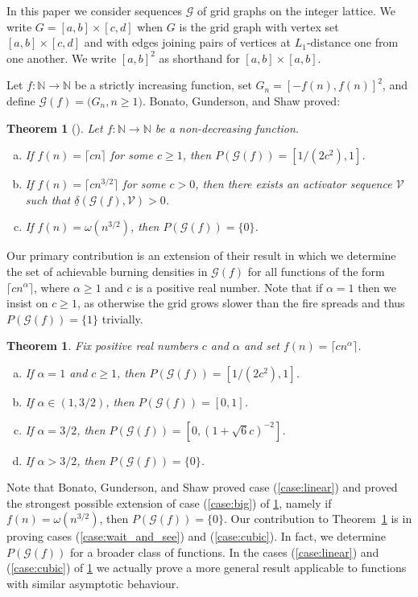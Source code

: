 \documentclass[12pt]{article}
\newtheorem{theorem}{Theorem}[section]
\newtheorem*{theorem*}{Theorem}
\theoremstyle{remark}
\providecommand{\N}{}
\renewcommand{\N}{{\mathbb N}}
\newcommand\cG{\mathcal G}
\newcommand\cV{\mathcal V}
\begin{document}
\medskip

In this paper we consider sequences $\cG$ of grid graphs on the integer lattice. We write $G = [a,b] \times [c,d]$ when $G$ is the grid graph with vertex set $[a,b] \times [c,d]$ and with edges joining pairs of vertices at $L_1$-distance one from one another. We write $[a,b]^2$ as shorthand for $[a,b] \times [a,b]$. 

Let $f: \N \to \N$ be a strictly increasing function, set $G_n = [-f(n),f(n)]^2$, and define $\cG(f) = \big( G_n, n\geq 1 \big)$. Bonato, Gunderson, and Shaw proved:
\begin{theorem*}[\cite{BGS20}]
Let $f : \N \to \N$ be a non-decreasing function.
\begin{enumerate}[(a)]
\item If $f(n) = \lceil cn \rceil$ for some $c \geq 1$, then $P(\cG(f)) = [1/(2c^2),1]$.
\item If $f(n) = \lceil cn^{3/2} \rceil$ for some $c > 0$, then there exists an activator sequence $\cV$ such that $\underline{\delta}(\cG(f),\cV) > 0$.
\item If $f(n) = \omega(n^{3/2})$, then $P(\cG(f)) = \{0\}$.
\end{enumerate}
\end{theorem*}

Our primary contribution is an extension of their result in which we determine the set of achievable burning densities in $\cG(f)$ for all functions of the form $\lceil cn^\alpha \rceil$, where $\alpha \geq 1$ and $c$ is a positive real number. Note that if $\alpha = 1$ then we insist on $c \geq 1$, as otherwise the grid grows slower than the fire spreads and thus $P(\cG(f)) = \{1\}$ trivially. 
\begin{theorem}\label{thm:main}
Fix positive real numbers $c$ and $\alpha$ and set $f(n) = \lceil cn^\alpha \rceil$.
\begin{enumerate}[(a)]
\item If $\alpha = 1$ and $c \geq 1$, then $P(\cG(f)) = [1/(2c^2),1]$. \label{case:linear}
\item If $\alpha \in (1,3/2)$, then $P(\cG(f)) = [0,1]$. \label{case:wait_and_see}
\item If $\alpha = 3/2$, then $P(\cG(f)) = [0,(1+\sqrt{6} c)^{-2}]$. \label{case:cubic}
\item If $\alpha > 3/2$, then $P(\cG(f)) = \{0\}$. \label{case:big}
\end{enumerate}
\end{theorem}

Note that Bonato, Gunderson, and Shaw proved case (\ref{case:linear}) and proved the strongest possible extension of case (\ref{case:big}) of \cref{thm:main}, namely if $f(n) = \omega(n^{3/2})$, then $P(\cG(f)) = \{0\}$. Our contribution to Theorem~\ref{thm:main} is in proving cases (\ref{case:wait_and_see}) and (\ref{case:cubic}). In fact, we determine $P(\cG(f))$ for a broader class of functions. In the cases (\ref{case:linear}) and (\ref{case:cubic}) of \cref{thm:main} we actually prove a more general result applicable to functions with similar asymptotic behaviour.
\end{document}
